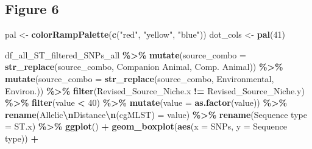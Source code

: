\documentclass[
]{article}
\newenvironment{Shaded}{\begin{snugshade}}{\end{snugshade}}
\newcommand{\AttributeTok}[1]{\textcolor[rgb]{0.13,0.29,0.53}{#1}}
\newcommand{\DecValTok}[1]{\textcolor[rgb]{0.00,0.00,0.81}{#1}}
\newcommand{\FunctionTok}[1]{\textcolor[rgb]{0.13,0.29,0.53}{\textbf{#1}}}
\newcommand{\NormalTok}[1]{#1}
\newcommand{\OtherTok}[1]{\textcolor[rgb]{0.56,0.35,0.01}{#1}}
\newcommand{\SpecialCharTok}[1]{\textcolor[rgb]{0.81,0.36,0.00}{\textbf{#1}}}
\newcommand{\StringTok}[1]{\textcolor[rgb]{0.31,0.60,0.02}{#1}}
\begin{document}
\hypertarget{figure-6}{%
\subsection{Figure 6}\label{figure-6}}

\begin{Shaded}
\begin{Highlighting}[]
\NormalTok{pal }\OtherTok{\textless{}{-}} \FunctionTok{colorRampPalette}\NormalTok{(}\FunctionTok{c}\NormalTok{(}\StringTok{"red"}\NormalTok{, }\StringTok{"yellow"}\NormalTok{, }\StringTok{"blue"}\NormalTok{))}
\NormalTok{dot\_cols }\OtherTok{\textless{}{-}} \FunctionTok{pal}\NormalTok{(}\DecValTok{41}\NormalTok{)}

\NormalTok{df\_all\_ST\_filtered\_SNPs\_all }\SpecialCharTok{\%\textgreater{}\%}
        \FunctionTok{mutate}\NormalTok{(}\AttributeTok{source\_combo =} \FunctionTok{str\_replace}\NormalTok{(source\_combo, }\StringTok{\textquotesingle{}Companion Animal\textquotesingle{}}\NormalTok{, }\StringTok{\textquotesingle{}Comp. Animal\textquotesingle{}}\NormalTok{)) }\SpecialCharTok{\%\textgreater{}\%} 
        \FunctionTok{mutate}\NormalTok{(}\AttributeTok{source\_combo =} \FunctionTok{str\_replace}\NormalTok{(source\_combo, }\StringTok{\textquotesingle{}Environmental\textquotesingle{}}\NormalTok{, }\StringTok{\textquotesingle{}Environ.\textquotesingle{}}\NormalTok{)) }\SpecialCharTok{\%\textgreater{}\%} 
        \FunctionTok{filter}\NormalTok{(Revised\_Source\_Niche.x }\SpecialCharTok{!=}\NormalTok{ Revised\_Source\_Niche.y) }\SpecialCharTok{\%\textgreater{}\%} 
        \FunctionTok{filter}\NormalTok{(value }\SpecialCharTok{\textless{}} \DecValTok{40}\NormalTok{)  }\SpecialCharTok{\%\textgreater{}\%} 
        \FunctionTok{mutate}\NormalTok{(}\AttributeTok{value =} \FunctionTok{as.factor}\NormalTok{(value)) }\SpecialCharTok{\%\textgreater{}\%}
        \FunctionTok{rename}\NormalTok{(}\StringTok{\textquotesingle{}Allelic}\SpecialCharTok{\textbackslash{}n}\StringTok{Distance}\SpecialCharTok{\textbackslash{}n}\StringTok{(cgMLST)\textquotesingle{}} \OtherTok{=}\NormalTok{ value) }\SpecialCharTok{\%\textgreater{}\%}
        \FunctionTok{rename}\NormalTok{(}\StringTok{\textquotesingle{}Sequence type\textquotesingle{}} \OtherTok{=}\NormalTok{ ST.x) }\SpecialCharTok{\%\textgreater{}\%}
        \FunctionTok{ggplot}\NormalTok{() }\SpecialCharTok{+}
        \FunctionTok{geom\_boxplot}\NormalTok{(}\FunctionTok{aes}\NormalTok{(}\AttributeTok{x =}\NormalTok{ SNPs, }\AttributeTok{y =} \StringTok{\textasciigrave{}}\AttributeTok{Sequence type}\StringTok{\textasciigrave{}}\NormalTok{)) }\SpecialCharTok{+}

\end{Highlighting}
\end{Shaded}
\end{document}
